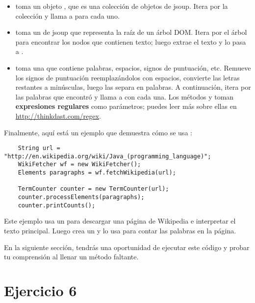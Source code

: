 \documentclass[12pt]{book}
\theoremstyle{exercise}
\begin{document}
\begin{itemize}

\item
   toma un objeto , que es una
  colección de objetos  de jsoup. Itera por la
  colección y llama a  para cada uno.

\item
   toma un  de jsoup que representa la
  raíz de un árbol DOM. Itera por el árbol para encontrar los nodos
  que contienen texto; luego extrae el texto y lo pasa a
  .

\item
   toma una  que contiene palabras, espacios,
  signos de puntuación, etc. Remueve los signos de puntuación reemplazándolos
  con espacios, convierte las letras restantes a minúsculas, luego
  las separa en palabras. A continuación, itera por las palabras que encontró
  y llama a  con cada una.  Los métodos 
  y  toman {\bf expresiones regulares} como parámetros;
  puedes leer más sobre ellas en \url{http://thinkdast.com/regex}.

\end{itemize}


Finalmente, aquí está un ejemplo que demuestra cómo se usa :

\begin{verbatim}
    String url = "http://en.wikipedia.org/wiki/Java_(programming_language)";
    WikiFetcher wf = new WikiFetcher();
    Elements paragraphs = wf.fetchWikipedia(url);

    TermCounter counter = new TermCounter(url);
    counter.processElements(paragraphs);
    counter.printCounts();
\end{verbatim}

Este ejemplo usa un  para descargar una página de
Wikipedia e interpretar el texto principal. Luego crea un
 y lo usa para contar las palabras en la página.


En la siguiente sección, tendrás una oportunidad de ejecutar este código y probar
tu comprensión al llenar un método faltante.


\section{Ejercicio 6}
\label{exercise6}
\end{document}
